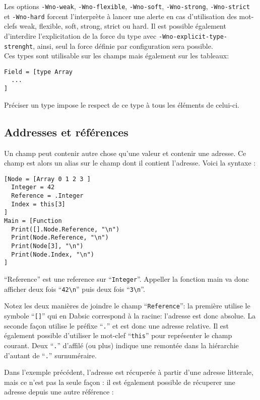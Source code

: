 \documentclass[a5paper, 12pt]{book}
\begin{document}
Les options \verb!-Wno-weak!, \verb!-Wno-flexible!, \verb!-Wno-soft!, \verb!-Wno-strong!, \verb!-Wno-strict!
et \verb!-Wno-hard! forcent l'interprète à lancer une alerte en cas d'utilisation
des mot-clefs weak, flexible, soft, strong, strict ou hard. Il est possible
également d'interdire l'explicitation de la force du type avec
\verb!-Wno-explicit-type-strenght!, ainsi, seul la force définie par configuration sera possible.\\

Ces types sont utilisable sur les champs mais également sur les tableaux:\\

\begin{verbatim}
Field = [type Array
  ...
]
\end{verbatim}

Préciser un type impose le respect de ce type à tous les éléments de
celui-ci.

\newpage

\subsection{Addresses et références}

Un champ peut contenir autre chose qu'une valeur et contenir une adresse.
Ce champ est alors un alias sur le champ dont il contient l'adresse. Voici
la syntaxe :\\
\begin{verbatim}
[Node = [Array 0 1 2 3 ]
  Integer = 42
  Reference = .Integer
  Index = this[3]
]
Main = [Function
  Print([].Node.Reference, "\n")
  Print(Node.Reference, "\n")
  Print(Node[3], "\n")
  Print(Node.Index, "\n")
]
\end{verbatim}

``Reference'' est une reference sur ``\verb!Integer!''. Appeller la fonction
main va donc afficher deux fois ``\verb!42\n!'' puis deux fois ``\verb!3\n!''.

Notez les deux manières de joindre le champ ``\verb!Reference!'': la première
utilise le symbole ``\verb![]!'' qui en Dabsic correspond à la racine:
l'adresse est donc absolue. La seconde façon utilise le préfixe ``\verb!.!''
et est donc une adresse relative. Il est également possible d'utiliser
le mot-clef ``\verb!this!'' pour représenter le champ courant.
Deux ``\verb!.!'' d'affilé (ou plus) indique une remontée dans la hiérarchie
d'autant de ``\verb!.!'' surnuméraire.

Dans l'exemple précédent, l'adresse est récuperée à partir d'une
adresse litterale, mais ce n'est pas la seule façon : il est également
possible de récuperer une adresse depuis une autre référence :
\end{document}
